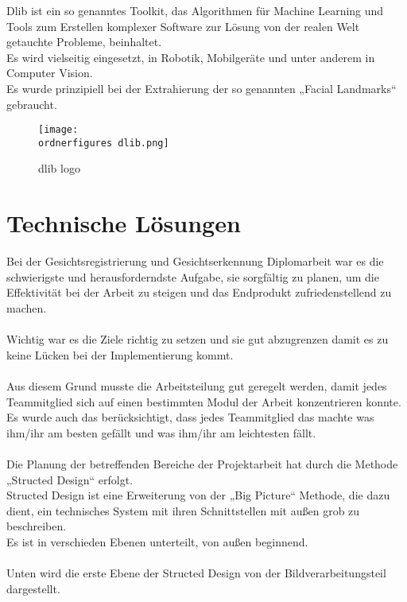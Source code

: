 Dlib ist ein so genanntes Toolkit, das Algorithmen für Machine Learning und Tools zum Erstellen komplexer Software zur Lösung von der realen Welt getauchte Probleme, beinhaltet.\\
Es wird vielseitig eingesetzt, in Robotik, Mobilgeräte und unter anderem in Computer Vision.\cite{dlib} \\
Es wurde prinzipiell bei der Extrahierung der so genannten „Facial Landmarks“ gebraucht. 

\begin{figure}
	\centering
	\texttt{[image: \\ordnerfigures dlib.png]}
	\caption{dlib logo \cite{dlib}}
	\label{fig:dlib logo}
\end{figure}


\section{Technische Lösungen}

Bei der Gesichtsregistrierung und Gesichtserkennung Diplomarbeit war es die schwierigste und herausforderndste Aufgabe, sie sorgfältig zu planen, um die Effektivität bei der Arbeit zu steigen und das Endprodukt zufriedenstellend zu machen. \\
 \\
Wichtig war es die Ziele richtig zu setzen und sie gut abzugrenzen damit es zu keine Lücken bei der Implementierung kommt.\\\\
Aus diesem Grund musste die Arbeitsteilung gut geregelt werden, damit jedes Teammitglied sich auf einen bestimmten Modul der Arbeit konzentrieren konnte.\\
Es wurde auch das berücksichtigt, dass jedes Teammitglied das machte was ihm/ihr am besten gefällt und was ihm/ihr am leichtesten fällt. \\ \\
Die Planung der betreffenden Bereiche der Projektarbeit hat durch die Methode „Structed Design“ erfolgt. \\
Structed Design ist eine Erweiterung von der „Big Picture“ Methode, die dazu dient, ein technisches System mit ihren Schnittstellen mit außen grob zu beschreiben. \\
Es ist in verschieden Ebenen unterteilt, von außen beginnend. \\ \\
Unten wird die erste Ebene der Structed Design von der Bildverarbeitungsteil dargestellt. \\

